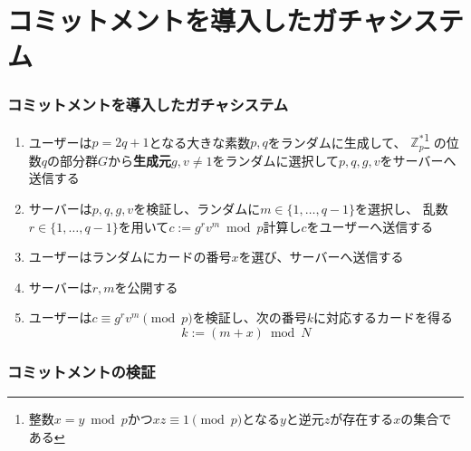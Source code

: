 \section{コミットメントを導入したガチャシステム}

\begin{frame}[label=protocol]
  \frametitle{コミットメントを導入したガチャシステム\cite{commitment}}

  \begin{enumerate}
    \item<2-> ユーザーは$p = 2q + 1$となる大きな素数$p, q$をランダムに生成して、
      $\mathbb{Z}^*_p$\footnote[frame]{整数$x = y \bmod p$かつ$xz \equiv 1 \pmod{p}$となる$y$と逆元$z$が存在する$x$の集合である}
      の位数$q$の部分群$G$から\textbf{生成元}$g, v \ne 1$をランダムに選択して$p, q, g, v$をサーバーへ送信する
    \item<3-> サーバーは$p, q, g, v$を検証し、ランダムに$m \in \{1, \dots, q - 1\}$を選択し、
      乱数$r \in \{1, \dots, q - 1\}$を用いて$c := g^r v^m \bmod p$計算し$c$をユーザーへ送信する
    \item<4-> ユーザーはランダムにカードの番号$x$を選び、サーバーへ送信する
    \item<5-> サーバーは$r, m$を公開する
    \item<6-> ユーザーは$c \equiv g^r v^m \pmod{p}$を検証し、次の番号$k$に対応するカードを得る
      \[
        k := (m + x) \bmod N
      \]
  \end{enumerate}
\end{frame}

\begin{frame}[fragile, label=mdash]
  \frametitle{コミットメントの検証}
  
  \begin{center}



  \end{center}
\end{frame}

